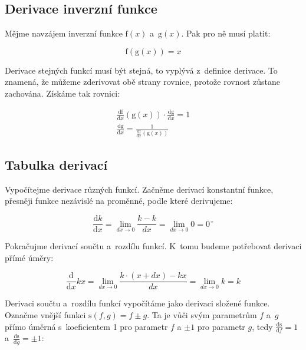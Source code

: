 \subsection{Derivace inverzní funkce}

Mějme navzájem inverzní funkce \(\mathrm{f}(x)\) a~\(\mathrm{g}(x)\). Pak pro ně musí platit:

\begin{equation}
\mathrm{f}(\mathrm{g}(x)) = x
\end{equation}

Derivace stejných funkcí musí být stejná, to vyplývá z~definice derivace. To znamená, že můžeme zderivovat obě strany rovnice, protože rovnost zůstane zachována. Získáme tak rovnici:

\begin{equation}
\label{eq:derivace_inverzni_funkce}
\begin{split}
\frac{\mathrm{df}}{\mathrm{d}x}(\mathrm{g}(x)) \cdot \frac{\mathrm{dg}}{\mathrm{d}x} = 1 \\
\frac{\mathrm{dg}}{\mathrm{d}x} = \frac{1}{\frac{\mathrm{df}}{\mathrm{d}x}(\mathrm{g}(x))}
\end{split}
\end{equation}

\subsection{Tabulka derivací}

Vypočítejme derivace různých funkcí. Začněme derivací konstantní funkce, přesněji funkce nezávislé na proměnné, podle které derivujeme:

\begin{equation}
\frac{\mathrm{d}k}{\mathrm{d}x} = \lim_{dx \to 0} \frac{k - k}{dx} = \lim_{dx \to 0} 0 = 0¨
\end{equation}

Pokračujme derivací součtu a~rozdílu funkcí. K~tomu budeme potřebovat derivaci přímé úměry:

\begin{equation}
\frac{\mathrm{d}}{\mathrm{d}x} kx = \lim_{dx \to 0} \frac{k \cdot (x + dx) - kx}{dx} = \lim_{dx \to 0} k = k
\end{equation}

Derivaci součtu a~rozdílu funkcí vypočítáme jako derivaci složené funkce. Označme vnější funkci \(\mathrm{s}(f, g) = f \pm g\). Ta je vůči svým parametrům \(f\) a~\(g\) přímo úměrná s~koeficientem 1 pro parametr \(f\) a \(\pm1\) pro parametr \(g\), tedy \(\frac{\mathrm{ds}}{\mathrm{d}f} = 1\) a~\(\frac{\mathrm{ds}}{\mathrm{d}g} = \pm1\):

